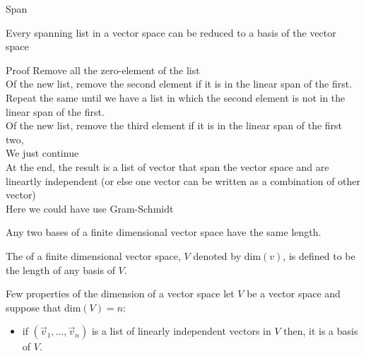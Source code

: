 \begin{parag}{Span}
   \begin{theoreme}
    Every spanning list in a vector space can be reduced to a basis of the vector space
   \end{theoreme} 
   \begin{subparag}{Proof}
       Remove all the zero-element of the list\\
       Of the new list, remove the second element if it is in the linear span of the first. Repeat the same until we have a list in which the second element is not in the linear span of the first.\\
       Of the new list, remove the third element if it is in the linear span of the first two,\\
       We just continue\\
       At the end,  the result is a list of vector that span the vector space and are lineartly independent (or else one vector can be written as a combination of other vector)\\
       Here we could have use Gram-Schmidt
   \end{subparag}
   \begin{theoreme}
   Any two bases of a finite dimensional vector space have the same length.
   \end{theoreme}
   The  of a finite dimensional vector space, $V$ denoted by dim$\left(v\right)$, is defined to be the length of any basis of $V$.
\end{parag}
\begin{parag}{Few properties of the dimension of a vector space}
    let $V$ be a vector space and suppose that dim$\left(V\right) =  n$:
    \begin{itemize}
        \item if $\left(\vec{v}_1, \ldots, \vec{v}_n\right)$ is a list of linearly independent vectors in $V$ then, it is a basis of $V$.
    \end{itemize}
    
\end{parag}
